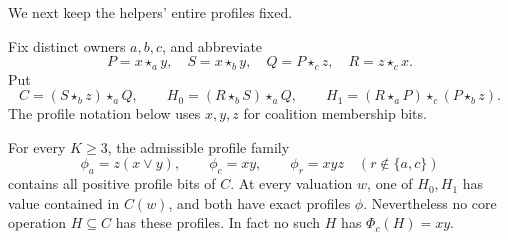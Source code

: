 We next keep the helpers' entire profiles fixed.

Fix distinct owners $a,b,c$, and abbreviate
\[
 P=x\star_a y,\quad S=x\star_b y,\quad
 Q=P\star_c z,\quad R=z\star_c x.
\]
Put
\begin{equation}\label{core:eq:profile-gluing-words}
 C=(S\star_b z)\star_a Q,\qquad
 H_0=(R\star_b S)\star_a Q,\qquad
 H_1=(R\star_a P)\star_c(P\star_b z).
\end{equation}
The profile notation below uses $x,y,z$ for coalition membership bits.

\begin{proposition}
\label{core:prop:profile-bound-gluing}
For every $K\geq3$, the admissible profile family
\[
 \phi_a=z(x\lor y),\qquad \phi_c=xy,\qquad
 \phi_r=xyz\quad(r\notin\{a,c\})
\]
contains all positive profile bits of $C$. At every valuation $w$, one of
$H_0,H_1$ has value contained in $C(w)$, and both have exact profiles
$\phi$. Nevertheless no core operation $H\subseteq C$ has these profiles.
In fact no such $H$ has $\Phi_c(H)=xy$.
\end{proposition}
